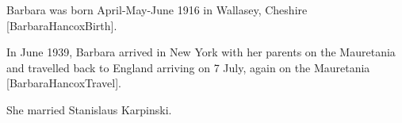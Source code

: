 
Barbara was born April-May-June 1916 	in Wallasey, Cheshire [BarbaraHancoxBirth].
	

In June 1939, Barbara arrived in New York with her parents on the Mauretania  and travelled back to England arriving on 7 July, again on the Mauretania [BarbaraHancoxTravel].

She married Stanislaus Karpinski.
